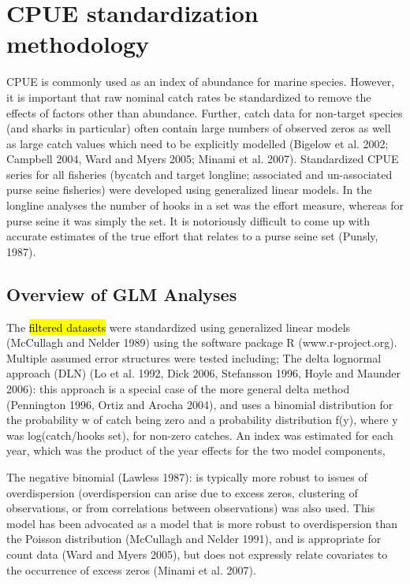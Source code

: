 \documentclass[12pt]{SCreport}
\begin{document}
\section*{CPUE standardization methodology}
CPUE is commonly used as an index of abundance for marine species.  However, it is important that raw nominal catch rates be standardized to remove the effects of factors other than abundance. Further, catch data for non-target species (and sharks in particular) often contain large numbers of observed zeros as well as large catch values which need to be explicitly modelled (Bigelow et al.  2002; Campbell  2004, Ward and Myers  2005; Minami et al.  2007).
Standardized CPUE series for all fisheries (bycatch and target longline; associated and un-associated purse seine fisheries) were developed using generalized linear models. In the longline analyses the number of hooks in a set was the effort measure, whereas for purse seine it was simply the set. It is notoriously difficult to come up with accurate estimates of the true effort that relates to a purse seine set (Punsly, 1987).
\subsection*{Overview of GLM Analyses}
The \hl{ filtered datasets }were standardized using generalized linear models (McCullagh and Nelder 1989) using the software package R (www.r-project.org). Multiple assumed error structures were tested including;
  The delta lognormal approach (DLN) (Lo et al. 1992, Dick 2006, Stefansson 1996, Hoyle and Maunder 2006): this approach is a special case of the more general delta method (Pennington 1996, Ortiz and Arocha 2004), and uses a binomial distribution for the probability w of catch being zero and a probability distribution f(y), where y was log(catch/hooks set), for non-zero catches. An index was estimated for each year, which was the product of the year effects for the two model components,%
		 
	   The negative binomial (Lawless 1987): is typically more robust to issues of overdispersion (overdispersion can arise due to excess zeros, clustering of observations, or from correlations between observations) was also used. This model has been advocated as a model that is more robust to overdispersion than the Poisson distribution (McCullagh and Nelder 1991), and is appropriate for count data (Ward and Myers  2005), but does not expressly relate covariates to the occurrence of excess zeros (Minami et al. 2007).
 
\end{document}
